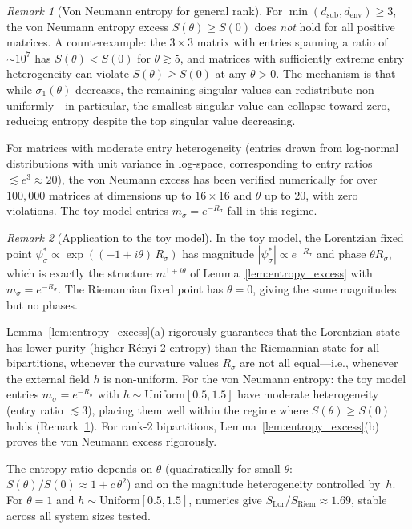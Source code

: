 \documentclass[12pt,a4paper]{article}
\theoremstyle{definition}
\theoremstyle{remark}
\newtheorem{remark}{Remark}
\begin{document}
\begin{remark}[Von Neumann entropy for general rank]
\label{rem:vn_general_rank}
For $\min(d_{\mathrm{sub}}, d_{\mathrm{env}}) \geq 3$, the von Neumann
entropy excess $S(\theta) \geq S(0)$ does \emph{not} hold for all
positive matrices. A counterexample: the $3 \times 3$ matrix with
entries spanning a ratio of $\sim\!10^7$ has $S(\theta) < S(0)$ for
$\theta \gtrsim 5$, and matrices with sufficiently extreme entry
heterogeneity can violate $S(\theta) \geq S(0)$ at any $\theta > 0$.
The mechanism is that while $\sigma_1(\theta)$ decreases, the remaining
singular values can redistribute non-uniformly---in particular, the
smallest singular value can collapse toward zero, reducing entropy
despite the top singular value decreasing.

For matrices with moderate entry heterogeneity (entries drawn from
log-normal distributions with unit variance in log-space, corresponding
to entry ratios $\lesssim e^3 \approx 20$), the von Neumann excess has
been verified numerically for over $100{,}000$ matrices at dimensions
up to $16 \times 16$ and $\theta$ up to $20$, with zero violations.
The toy model entries $m_\sigma = e^{-R_\sigma}$ fall in this regime.
\end{remark}

\begin{remark}[Application to the toy model]
\label{rem:entropy_application}
In the toy model, the Lorentzian fixed point
$\psi^*_\sigma \propto \exp((-1 + i\theta)\, R_\sigma)$ has magnitude
$|\psi^*_\sigma| \propto e^{-R_\sigma}$ and phase $\theta R_\sigma$,
which is exactly the structure $m^{1+i\theta}$ of
Lemma~\ref{lem:entropy_excess} with $m_\sigma = e^{-R_\sigma}$. The
Riemannian fixed point has $\theta = 0$, giving the same magnitudes
but no phases.

Lemma~\ref{lem:entropy_excess}(a) rigorously guarantees that the
Lorentzian state has lower purity (higher R\'enyi-2 entropy) than the
Riemannian state for all bipartitions, whenever the curvature values
$R_\sigma$ are not all equal---i.e., whenever the external field $h$
is non-uniform. For the von Neumann entropy: the toy model entries
$m_\sigma = e^{-R_\sigma}$ with $h \sim \mathrm{Uniform}[0.5, 1.5]$
have moderate heterogeneity (entry ratio $\lesssim 3$), placing them
well within the regime where $S(\theta) \geq S(0)$ holds
(Remark~\ref{rem:vn_general_rank}). For rank-2 bipartitions,
Lemma~\ref{lem:entropy_excess}(b) proves the von Neumann excess
rigorously.

The entropy ratio depends on $\theta$ (quadratically
for small $\theta$: $S(\theta)/S(0) \approx 1 + c\,\theta^2$) and on
the magnitude heterogeneity controlled by~$h$. For $\theta = 1$ and
$h \sim \mathrm{Uniform}[0.5, 1.5]$, numerics give
$S_{\mathrm{Lor}}/S_{\mathrm{Riem}} \approx 1.69$, stable across all
system sizes tested.
\end{remark}
\end{document}

